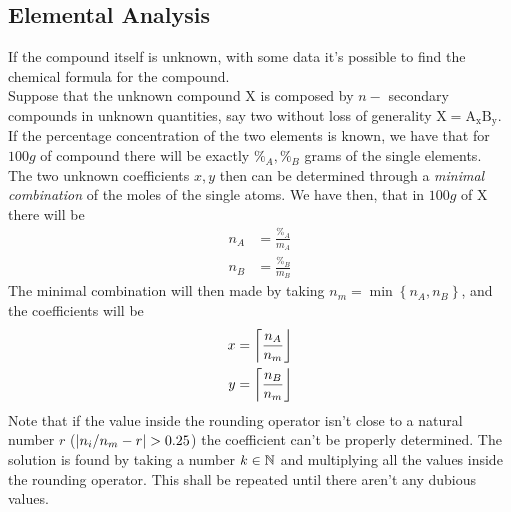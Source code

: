 \documentclass[../qm.tex]{subfiles}
\begin{document}
\subsection{Elemental Analysis}
If the compound itself is unknown, with some data it's possible to find the chemical formula for the compound.\\
Suppose that the unknown compound $\mathrm{X}$ is composed by $n-$ secondary compounds in unknown quantities, say two without loss of generality $\mathrm{X}=\mathrm{A_xB_y}$. If the percentage concentration of the two elements is known, we have that for $100\unit{g}$ of compound there will be exactly $\%_A,\%_B$ grams of the single elements.\\
The two unknown coefficients $x,y$ then can be determined through a \textit{minimal combination} of the moles of the single atoms. We have then, that in $100\unit{g}$ of $\mathrm{X}$ there will be
\begin{equation}
	\begin{aligned}
		n_A&=\frac{\%_A}{m_A}\\
		n_B&=\frac{\%_B}{m_B}
	\end{aligned}
	\label{eq:molesin100g}
\end{equation}
The minimal combination will then made by taking $n_m=\min\left\{ n_A,n_B \right\}$, and the coefficients will be
\begin{equation}
	\begin{aligned}
		x&=\rounding*{\frac{n_A}{n_m}}\\
		y&=\rounding*{\frac{n_B}{n_m}}
	\end{aligned}
	\label{eq:coefelan}
\end{equation}
Note that if the value inside the rounding operator isn't close to a natural number $r$ ($\abs{n_i/n_m-r}>0.25$) the coefficient can't be properly determined. The solution is found by taking a number $k\in\mathbb{N}$ and multiplying all the values inside the rounding operator. This shall be repeated until there aren't any dubious values.
\end{document}
